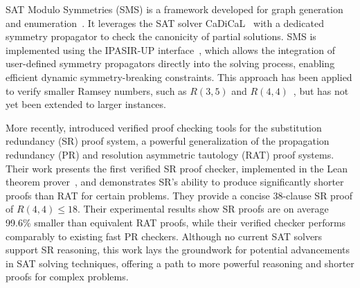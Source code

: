 SAT Modulo Symmetries (SMS) is a framework developed for graph generation and enumeration~\cite{pysms}.
It leverages the SAT solver CaDiCaL~\cite{Biere2024} with a dedicated symmetry propagator to check the canonicity of partial solutions. SMS is implemented using the IPASIR-UP interface~\cite{fazekas2023ipasir}, which allows the integration of user-defined symmetry propagators directly into the solving process, enabling efficient dynamic symmetry-breaking constraints.
This approach has been applied to verify smaller Ramsey numbers, such as $R(3,5)$ and $R(4,4)$~\cite{SMS2ramsey}, but has not yet been extended to larger instances. %

More recently,  introduced verified proof checking tools for the substitution redundancy (SR) proof system,
a powerful generalization of the propagation redundancy (PR) and resolution asymmetric tautology (RAT) proof systems.
Their work presents the first verified SR proof checker, implemented in the Lean theorem prover~\cite{deMoura2015},
and demonstrates SR's ability to produce significantly shorter proofs than RAT for certain problems.
They provide a concise 38-clause SR proof of $R(4,4) \leq 18$. Their experimental results show SR proofs are on average 99.6\% smaller than equivalent RAT proofs, while their verified checker performs comparably to existing fast PR checkers. Although no current SAT solvers support SR reasoning, this work lays the groundwork for potential advancements in SAT solving techniques, offering a path to more powerful reasoning and shorter proofs for complex problems.

